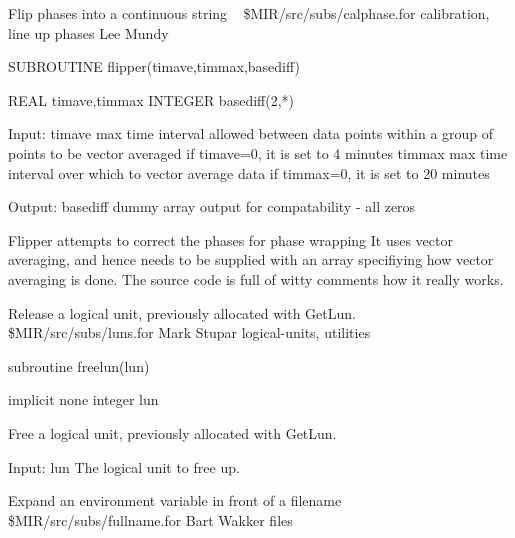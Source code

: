 %
\noindent Flip phases into a continuous string
\newline \ 
\newline {} \$MIR/src/subs/calphase.for
\newline {} calibration, line up phases
\newline {} Lee Mundy
\par{\tenpoint
{\eightpoint\begintt
        SUBROUTINE flipper(timave,timmax,basediff)

        REAL    timave,timmax
        INTEGER basediff(2,*)

   Input:
       timave    max time interval allowed between data points within
                     a group of points to be vector averaged
                     if timave=0, it is set to 4 minutes
       timmax    max time interval over which to vector average data
                     if timmax=0, it is set to 20 minutes

   Output:
       basediff  dummy array output for compatability - all zeros

   Flipper attempts to correct the phases for phase wrapping
   It uses vector averaging, and hence needs to be supplied
   with an array specifiying how vector averaging is done.
   The source code is full of witty comments how it really
   works.
\endtt}
\par}
%
\noindent Release a logical unit, previously allocated with GetLun.
\newline \ 
\newline \abox{File:} \$MIR/src/subs/luns.for
\newline {} Mark Stupar
\newline \abox{Keywords:} logical-units, utilities
\par{\tenpoint
{\eightpoint\begintt
        subroutine freelun(lun)

        implicit none
        integer lun

  Free a logical unit, previously allocated with GetLun.

  Input:
    lun        The logical unit to free up.
\endtt}
\par}
%
\noindent Expand an environment variable in front of a filename
\newline \ 
\newline {} \$MIR/src/subs/fullname.for
\newline \abox{Responsible:} Bart Wakker
\newline {} files
